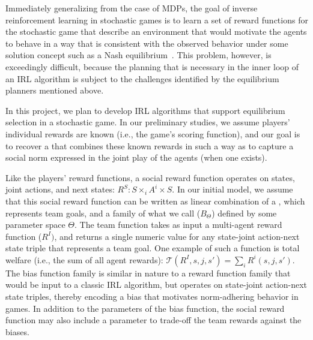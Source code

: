 Immediately generalizing from the case of MDPs, the goal of inverse
reinforcement learning in stochastic games is to learn a set of reward
functions for the stochastic game that describe an environment that
would motivate the agents to behave in a way that is consistent with
the observed behavior under some solution concept such as a Nash
equilibrium~\cite{reddy2012inverse}.  This problem, however, is
exceedingly difficult, because the planning that is necessary in the
inner loop of an IRL algorithm is subject to the challenges identified
by the equilibrium planners mentioned above.


In this project, we plan to develop IRL algorithms that support
equilibrium selection in a stochastic game.  In our preliminary
studies, we assume players' individual rewards are known (i.e., the
game's scoring function), and our goal is to recover a  that combines these known rewards in such a way as
to capture a social norm expressed in the joint play of the agents
(when one exists).

Like the players' reward functions, a social reward function operates
on states, joint actions, and next states: $R^S : S \times_i A^i
\times S$.  In our initial model, we assume that this social reward
function can be written as linear combination of a , which represents team goals,
and a family of what we call  ($B_\Theta$)
defined by some parameter space $\Theta$.  The team function takes as
input a multi-agent reward function ($R^I)$, and returns a single
numeric value for any state-joint action-next state triple that
represents a team goal. One example of such a function is total
welfare (i.e., the sum of all agent rewards): 
${\mathcal T}(R^I, s, j, s') = \sum_i R^i(s, j, s')$.
%
The bias function family is similar in nature to a reward function
family that would be input to a classic IRL algorithm, but operates on
state-joint action-next state triples, thereby encoding a bias that
motivates norm-adhering behavior in games.  In addition to the
parameters of the bias function, the social reward function may also
include a parameter
to trade-off the team rewards against the biases.


